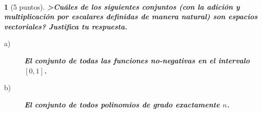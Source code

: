 \documentclass[12pt,a4paper]{report}
\newtheorem{ex}{}
\begin{document}

\hrulefill{}\\ 
\begin{ex}[5 puntos]   
 {\bf >Cu\'ales de los siguientes conjuntos (con la adici\'on y multiplicaci\'on por escalares definidas de manera natural) son espacios vectoriales? Justifica tu respuesta.}
\begin{description}
\item[a)]  {\bf El conjunto de todas las funciones no-negativas en el intervalo $[0,1]$.}
\item[b)] {\bf El conjunto de todos polinomios de grado \emph{exactamente} $n$.}
\end{description}

\end{ex} 
\end{document}
